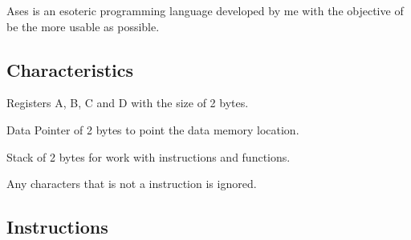 Ases is an esoteric programming language developed by me with the objective of be the more usable as possible.

\subsection*{Characteristics}


\begin{DoxyItemize}
\item Registers A, B, C and D with the size of 2 bytes.
\item Data Pointer of 2 bytes to point the data memory location.
\item Stack of 2 bytes for work with instructions and functions.
\item Any characters that is not a instruction is ignored.
\end{DoxyItemize}

\subsection*{Instructions}

